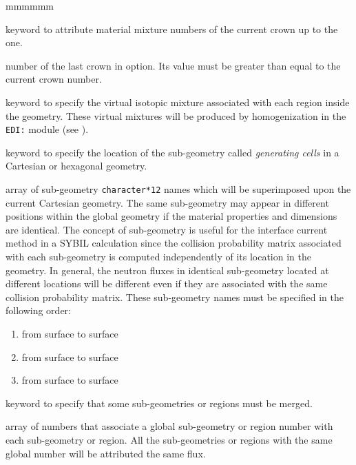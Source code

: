 \begin{ListeDeDescription}{mmmmmm}
\item[\moc{UPTO}] keyword to attribute material mixture numbers of the current crown up to the  one. 

\item[\dusa{ic}] number of the last crown in  option. Its value must be greater than equal to the current 
crown number.

\item[\moc{HMIX}] keyword to specify the virtual isotopic mixture associated with each region inside the geometry. These
virtual mixtures will be produced by homogenization in the {\tt EDI:} module (see ).

\item[\moc{CELL}] keyword to specify the location of the sub-geometry called
{\sl generating cells} in a Cartesian or hexagonal geometry.

\item[\dusa{HCELL}] array of sub-geometry {\tt character*12} names which will
be superimposed upon the current Cartesian geometry. The same sub-geometry may
appear in different positions within the global geometry if the material
properties and dimensions are identical. The concept of sub-geometry is useful
for the interface current method in a SYBIL calculation since the collision
probability matrix associated with each sub-geometry is computed independently
of its location in the geometry. In general, the neutron fluxes in identical
sub-geometry located at different locations will be different even if they are
associated with the same collision probability matrix. These sub-geometry names
must be specified in the following order: 

\begin{enumerate}
\item from surface  to surface 
\item from surface  to surface 
\item from surface  to surface 
\end{enumerate}

\item[\moc{MERGE}] keyword to specify that some sub-geometries or regions must
be merged. 

\item[\dusa{imerge}] array of numbers that associate a global sub-geometry or
region number with each sub-geometry or region. All the sub-geometries  or
regions with the same global number will be attributed the same flux.


\end{ListeDeDescription}
